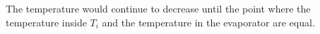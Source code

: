 The temperature would continue to decrease until the point where the temperature inside \( T_i \) and the temperature in the evaporator are equal.